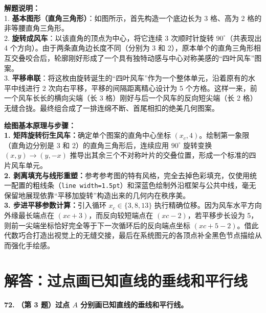 \vspace{0.6cm}

{\small\color{gray}
\textbf{解题说明：}\\
1. \textbf{基本图形（直角三角形）}：如图所示，首先构造一个底边长为 3 格、高为 2 格的非等腰直角三角形。\\
2. \textbf{旋转成风车}：以该直角的顶点为中心，将它连续 3 次顺时针旋转 $90^\circ$（共表现出 4 个方向）。由于两条直角边长度不同（分别为 3 和 2），原本单个的直角三角形相互交叠咬合后，轮廓刚好形成了一个具有独特动感与中心对称美感的“四叶风车”图案。\\
3. \textbf{平移串联}：将这枚由旋转诞生的“四叶风车”作为一个整体单元，沿着原有的水平中线进行 2 次向右平移，平移的间隔距离精心设计为 5 个方格。这样一来，前一个风车长长的横向尖端（长 3 格）刚好与后一个风车的反向短尖端（长 2 格）无缝合拢。最终组合成了一排连绵不断、首尾相扣的绝美几何图案。
}

\vspace{0.6cm}

{\small\color{blue!70!black}
\textbf{绘图基本原理与步骤：}\\
\textbf{1. 矩阵旋转衍生风车：}确定单个图案的直角中心坐标 $(x_c, 4)$。绘制第一象限（直角边分别是 3 和 2）的直角三角形后，连续应用 $90^\circ$ 旋转变换 $(x,y) \to (y,-x)$ 推导出其余三个不对称叶片的交叠位置，形成一个标准的四片风车单元。\\
\textbf{2. 剥离填充与线形重塑：}参考参考图的特有风格，完全去掉色彩填充，仅使用统一配置的粗线条（\texttt{line width=1.5pt}）和深蓝色绘制外沿框架与公共中线，毫无保留地展现依靠“平移加旋转”构造出来的几何内在秩序美。\\
\textbf{3. 步进平移参数计算：}引入循环 $x_c \in \{3, 8, 13\}$ 执行精确位移。因为风车水平方向外缘最长端点在 $(xc+3)$，而反向较短端点在 $(xc-2)$，若平移步长设为 5，则前一尖端坐标恰好完全等于下一次循环后的反向端点坐标 $(xc+5-2)$。借此代数巧合打造出视觉上的无缝交接，最后在系统图元的各顶点补全黑色节点描绘从而强化手绘感。
}

\newpage



\section{解答：过点画已知直线的垂线和平行线}

\vspace{0.6cm}

\textbf{\LARGE 72.} \textbf{（第 3 题）过点 $A$ 分别画已知直线的垂线和平行线。}

